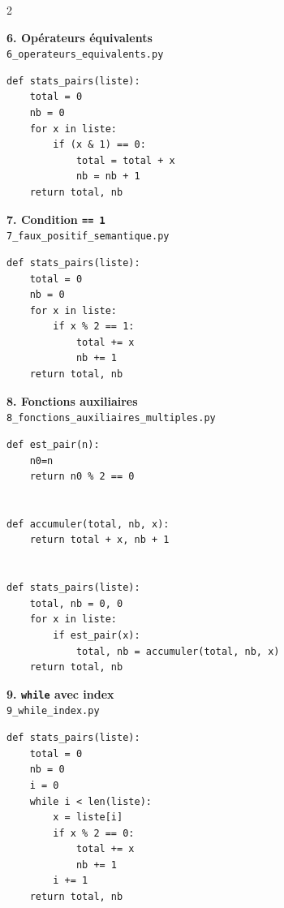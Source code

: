 \documentclass[12pt,a4paper,oneside]{report}
\begin{document}
\begin{multicols}{2}
\noindent\begin{minipage}{\linewidth}
\textbf{6. Opérateurs équivalents}\\
{\footnotesize \texttt{6\_operateurs\_equivalents.py}}
\begin{lstlisting}[style=pyncst, basicstyle=\ttfamily\scriptsize, breaklines=true]
def stats_pairs(liste):
    total = 0
    nb = 0
    for x in liste:
        if (x & 1) == 0:
            total = total + x
            nb = nb + 1
    return total, nb
\end{lstlisting}
\end{minipage}
\medskip


\noindent\begin{minipage}{\linewidth}
\textbf{7. Condition \texttt{== 1}}\\
{\footnotesize \texttt{7\_faux\_positif\_semantique.py}}
\begin{lstlisting}[style=pyncst, basicstyle=\ttfamily\scriptsize, breaklines=true]
def stats_pairs(liste):
    total = 0
    nb = 0
    for x in liste:
        if x % 2 == 1:
            total += x
            nb += 1
    return total, nb
\end{lstlisting}
\end{minipage}
\medskip


\noindent\begin{minipage}{\linewidth}
\textbf{8. Fonctions auxiliaires}\\
{\footnotesize \texttt{8\_fonctions\_auxiliaires\_multiples.py}}
\begin{lstlisting}[style=pyncst, basicstyle=\ttfamily\scriptsize, breaklines=true]
def est_pair(n):
    n0=n
    return n0 % 2 == 0


def accumuler(total, nb, x):
    return total + x, nb + 1


def stats_pairs(liste):
    total, nb = 0, 0
    for x in liste:
        if est_pair(x):
            total, nb = accumuler(total, nb, x)
    return total, nb
\end{lstlisting}
\end{minipage}
\medskip


\noindent\begin{minipage}{\linewidth}
\textbf{9. \texttt{while} avec index}\\
{\footnotesize \texttt{9\_while\_index.py}}
\begin{lstlisting}[style=pyncst, basicstyle=\ttfamily\scriptsize, breaklines=true]
def stats_pairs(liste):
    total = 0
    nb = 0
    i = 0
    while i < len(liste):
        x = liste[i]
        if x % 2 == 0:
            total += x
            nb += 1
        i += 1
    return total, nb
\end{lstlisting}
\end{minipage}
\medskip



\end{multicols}
\end{document}

